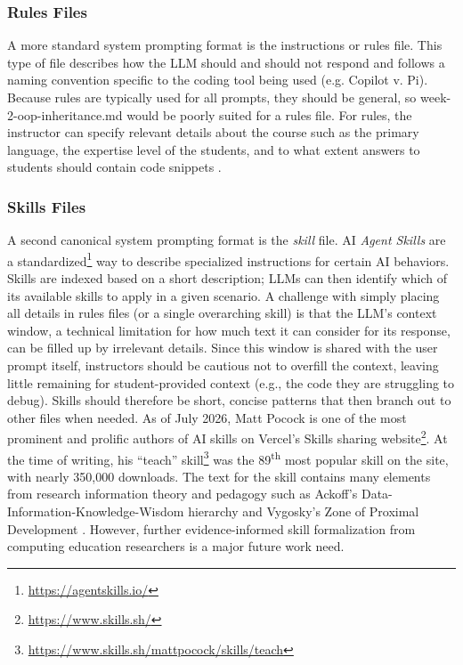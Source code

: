 \subsubsection{Rules Files}\label{rules-files}

A more standard system prompting format is the instructions or rules file. This type of file describes how the LLM should and should not respond and follows a naming convention specific to the coding tool being used (e.g. Copilot v. Pi). Because rules are typically used for all prompts, they should be general, so week-2-oop-inheritance.md would be poorly suited for a rules file. For rules, the instructor can specify relevant details about the course such as the primary language, the expertise level of the students, and to what extent answers to students should contain code snippets \cite{liffitonCodeHelpUsingLarge2023,liuTeachingCS50AI2024}.

\subsubsection{Skills Files}\label{skills-files}

A second canonical system prompting format is the \emph{skill} file. AI \emph{Agent Skills} are a standardized\footnote{\url{https://agentskills.io/}} way to describe specialized instructions for certain AI behaviors. Skills are indexed based on a short description; LLMs can then identify which of its available skills to apply in a given scenario. A challenge with simply placing all details in rules files (or a single overarching skill) is that the LLM's context window, a technical limitation for how much text it can consider for its response, can be filled up by irrelevant details. Since this window is shared with the user prompt itself, instructors should be cautious not to overfill the context, leaving little remaining for student-provided context (e.g., the code they are struggling to debug). Skills should therefore be short, concise patterns that then branch out to other files when needed. As of July 2026, Matt Pocock \cite{pocockMattpocockSkills2026} is one of the most prominent and prolific authors of AI skills on Vercel's Skills sharing website\footnote{\url{https://www.skills.sh/}}. At the time of writing, his ``teach'' skill\footnote{\url{https://www.skills.sh/mattpocock/skills/teach}} was the 89\textsuperscript{th} most popular skill on the site, with nearly 350,000 downloads. The text for the skill contains many elements from research information theory and pedagogy such as Ackoff's Data-Information-Knowledge-Wisdom hierarchy \cite{ackoffDataWisdom1989} and Vygosky's Zone of Proximal Development \cite{vygotskyMindSocietyDevelopment1978a}. However, further evidence-informed skill formalization from computing education researchers is a major future work need.

